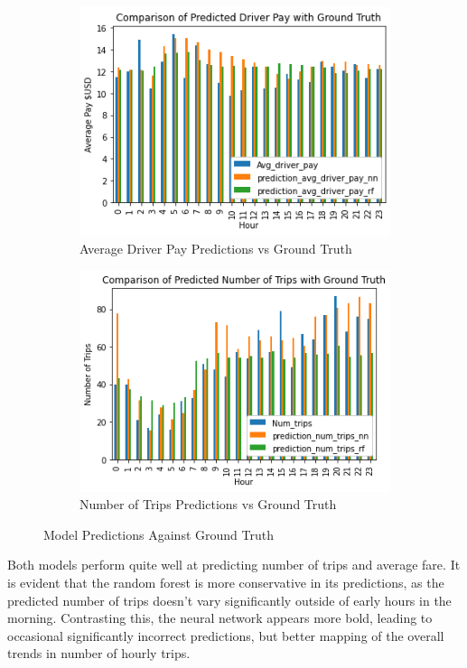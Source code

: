 \documentclass[11pt]{article}
\begin{document}
\begin{figure}[h]
\centering
\begin{subfigure}{.5\textwidth}
  \centering
  \includegraphics[width=0.9\linewidth]{plots/hourly_pay_predictions.png}
  \caption{Average Driver Pay Predictions vs Ground Truth}
  \label{fig:sub1}
\end{subfigure}%
\begin{subfigure}{.5\textwidth}
  \centering
  \includegraphics[width=0.9\linewidth]{plots/hourly_trips_predictions.png}
  \caption{Number of Trips Predictions vs Ground Truth}
  \label{fig:sub2}
\end{subfigure}
\caption{Model Predictions Against Ground Truth}
\label{fig:test}
\end{figure}

Both models perform quite well at predicting number of trips and average fare. It is evident that the random forest is more conservative in its predictions, as the predicted number of trips doesn't vary significantly outside of early hours in the morning. Contrasting this, the neural network appears more bold, leading to occasional significantly incorrect predictions, but better mapping of the overall trends in number of hourly trips.
\end{document}
